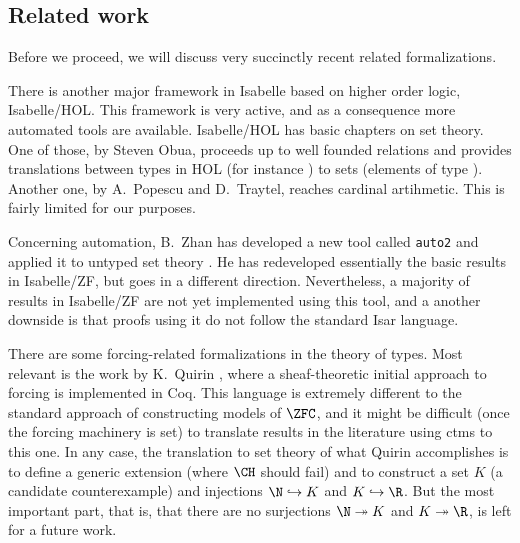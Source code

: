 \subsection{Related work}\label{sec:related-work}
Before we proceed, we will discuss very succinctly recent related
formalizations.

There is another major framework in Isabelle based on higher order
logic, Isabelle/HOL. This framework is very active, and as a 
consequence more automated tools are available. Isabelle/HOL has 
basic chapters on set theory. One of those, by Steven Obua, proceeds up to
well founded relations and provides translations between types in HOL
(for instance ) to  sets  (elements of type
). Another one, by A.~Popescu and D.~Traytel, reaches
cardinal artihmetic. This is fairly limited for our purposes.

Concerning automation, B.~Zhan has developed a new tool called
\texttt{auto2} and applied it to untyped set theory
\cite{10.1007/978-3-319-66107-0_32}. He has redeveloped essentially
the basic results in Isabelle/ZF, but goes in a different
direction. Nevertheless, a majority of results in
Isabelle/ZF are not yet implemented using this tool, and a another
downside is that proofs using it do not follow the standard Isar
language.

There are some forcing-related formalizations in the theory
of types. Most relevant is the work by K.~Quirin \cite{Quirin}, where
a sheaf-theoretic initial approach to forcing is implemented in
Coq. This language is extremely different to the standard approach of
constructing models of $\ZFC$, and it might be difficult (once the
forcing machinery is set) to translate results in the literature using
ctms to this one. In any case, the translation to set theory of what
Quirin accomplishes is to define a generic extension (where $\CH$
should fail) and to construct a set $K$ (a candidate counterexample)
and injections $\N\hookrightarrow K$ and $K\hookrightarrow\R$. But the
most important part, that is, that there are no surjections 
$\N\twoheadrightarrow K$ and $K\twoheadrightarrow\R$, is left for a future
work. %


